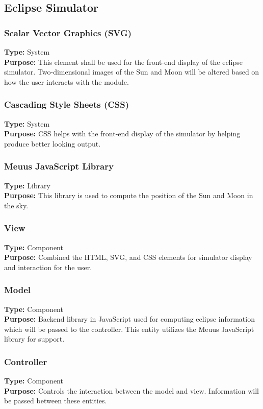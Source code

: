 \documentclass[10pt, onecolumn, draftclsnofoot, letterpaper, compsoc]{IEEEtran}
\begin{document}
\subsection{Eclipse Simulator}

  \subsubsection{Scalar Vector Graphics (SVG)}
  \textbf{Type:} System \\
  \textbf{Purpose:} This element shall be used for the
  front-end display of the eclipse simulator.
  Two-dimensional images of the Sun and Moon will be altered
  based on how the user interacts with the module.


  \subsubsection{Cascading Style Sheets (CSS)}
  \textbf{Type:} System \\
  \textbf{Purpose:} CSS helps with the front-end display of
  the simulator by helping produce better looking output.

  \subsubsection{Meuus JavaScript Library}
  \textbf{Type:} Library \\
  \textbf{Purpose:} This library is used to compute the position of the Sun and
  Moon in the sky.

  \subsubsection{View}
  \textbf{Type:} Component \\
  \textbf{Purpose:} Combined the HTML, SVG, and CSS elements
  for simulator display and interaction for the user.

  \subsubsection{Model}
  \textbf{Type:} Component \\
  \textbf{Purpose:} Backend library in JavaScript used for
  computing eclipse information which will be passed to the
  controller. This entity utilizes the Meuus JavaScript
  library for support.

  \subsubsection{Controller}
  \textbf{Type:} Component \\
  \textbf{Purpose:}  Controls the interaction between the
  model and view. Information will be passed between these
  entities.
\end{document}
